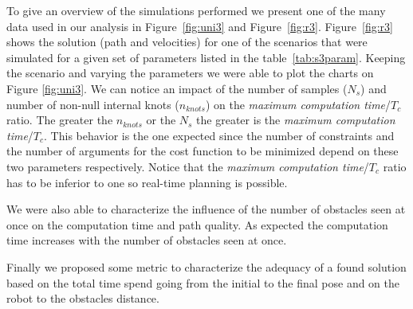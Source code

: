 To give an overview of the simulations performed we present one of the many data used in our analysis in Figure~\ref{fig:uni3} and Figure~\ref{fig:r3}. Figure~\ref{fig:r3} shows the solution (path and velocities) for one of the scenarios that were simulated for a given set of parameters listed in the table~\ref{tab:s3param}. Keeping the scenario and varying the parameters we were able to plot the charts on Figure \ref{fig:uni3}. We can notice an impact of the number of samples ($N_s$) and number of non-null internal knots ($n_{knots}$) on the \textit{maximum computation time}/$T_c$ ratio. The greater the $n_{knots}$ or the $N_s$ the greater is the \textit{maximum computation time}/$T_c$. This behavior is the one expected since the number of constraints and the number of arguments for the cost function to be minimized depend on these two parameters respectively. Notice that the \textit{maximum computation time}/$T_c$ ratio has to be inferior to one so real-time planning is possible.

We were also able to characterize the influence of the number of obstacles seen at once on the computation time and path quality. As expected the computation time increases with the number of obstacles seen at once.

Finally we proposed some metric to characterize the adequacy of a found solution based on the total time spend going from the initial to the final pose and on the robot to the obstacles distance.




